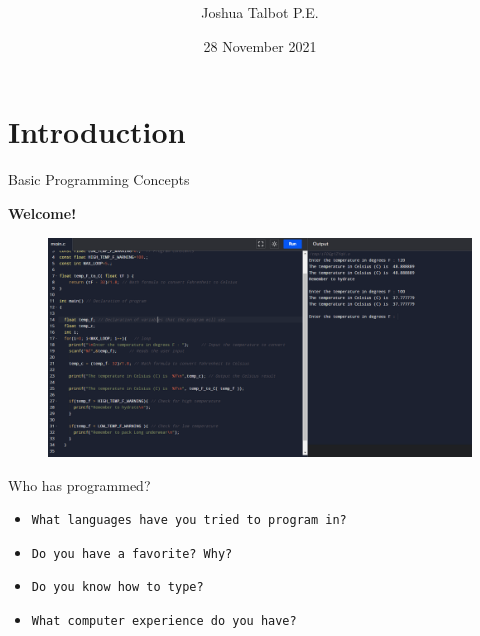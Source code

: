 \documentclass[10pt]{beamer}
\title[Programming Merit Badge]{ }
\author{Joshua Talbot P.E.}
\institute{}
\date{28 November 2021}
\begin{document}

\section{Introduction}

{\1%


\begin{frame}{Basic Programming Concepts}{ }
\begin{center}
\begin{block}{}
\center \textbf{Welcome!}
\end{block}
\vspace{0.5cm}
\begin{figure}%
\includegraphics[width=\textwidth]{img/C_code.png}
\end{figure}
\end{center}
\end{frame}


\begin{frame}{Who has programmed?}{ }  
\begin{block}{}
  \begin{itemize}
    \item {\tt What languages have you tried to program in?}
    \item {\tt Do you have a favorite?  Why?}
    \item {\tt Do you know how to type?}
    \item {\tt What computer experience do you have?}
    \end{itemize}
  \end{block}
\end{frame}

}
\end{document}
